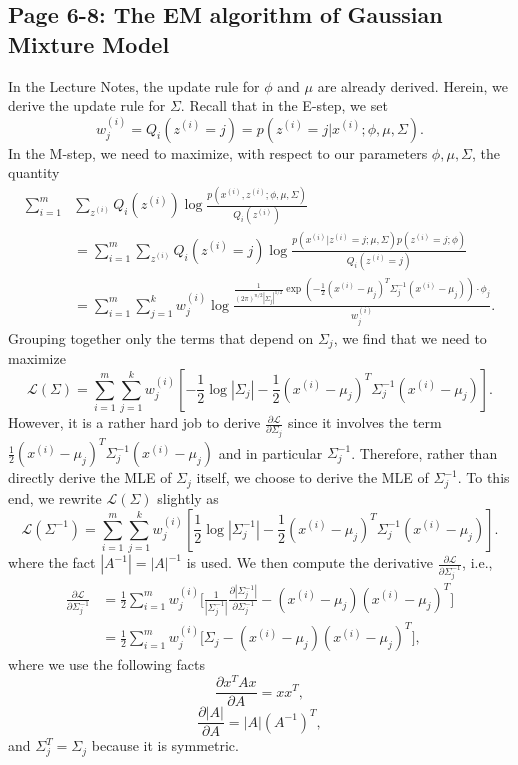\documentclass{article}
\begin{document}
\subsection{Page 6-8: The EM algorithm of Gaussian Mixture Model}
In the Lecture Notes, the update rule for $\phi$ and $\mu$ are already derived. Herein, we derive the update rule for $\Sigma$. Recall that in the E-step, we set
\[
w_j^{(i)}=Q_i(z^{(i)}=j)=p(z^{(i)}=j|x^{(i)};\phi,\mu,\Sigma).
\]
In the M-step, we need to maximize, with respect to our parameters $\phi,\mu,\Sigma$, the quantity
\[
\begin{split}
\sum_{i=1}^m &\sum_{z^{(i)}}Q_i(z^{(i)})\log\frac{p(x^{(i)},z^{(i)};\phi,\mu,\Sigma)}{Q_i(z^{(i)})}\\
&=\sum_{i=1}^m \sum_{z^{(i)}}Q_i(z^{(i)}=j)\log\frac{p(x^{(i)}|z^{(i)}=j;\mu,\Sigma)p(z^{(i)}=j;\phi)}{Q_i(z^{(i)}=j)}\\
&=\sum_{i=1}^m \sum_{j=1}^k w_j^{(i)}\log\frac{\frac{1}{(2\pi)^{n/2}|\Sigma_j|^{1/2}}%
            \exp{\left(-\frac{1}{2}(x^{(i)}-\mu_j)^T\Sigma_j^{-1}(x^{(i)}-\mu_j)\right)}\cdot\phi_j}{w_j^{(i)}}.
\end{split}
\]
Grouping together only the terms that depend on $\Sigma_j$, we find that we need to maximize
\[
\mathcal{L}(\Sigma)=\sum_{i=1}^m \sum_{j=1}^k w_j^{(i)}
\left[-\frac{1}{2}\log|\Sigma_j|-\frac{1}{2}(x^{(i)}-\mu_j)^T\Sigma_j^{-1}(x^{(i)}-\mu_j)\right].
\]
However, it is a rather hard job to derive $\frac{\partial{\mathcal{L}}}{\partial{\Sigma_j}}$ since it involves the term $\frac{1}{2}(x^{(i)}-\mu_j)^T\Sigma_j^{-1}(x^{(i)}-\mu_j)$ and in particular $\Sigma_j^{-1}$. Therefore, rather than directly derive the MLE of $\Sigma_j$ itself, we choose to derive the MLE of $\Sigma_j^{-1}$. To this end, we rewrite $\mathcal{L}(\Sigma)$ slightly as
\[
\mathcal{L}(\Sigma^{-1})=\sum_{i=1}^m \sum_{j=1}^k w_j^{(i)}
\left[\frac{1}{2}\log|\Sigma_j^{-1}|-\frac{1}{2}(x^{(i)}-\mu_j)^T\Sigma_j^{-1}(x^{(i)}-\mu_j)\right].
\]
where the fact $|A^{-1}|=|A|^{-1}$ is used. We then compute the derivative $\frac{\partial{\mathcal{L}}}{\partial{\Sigma_j^{-1}}}$, i.e.,
\[
\begin{split}
\frac{\partial{\mathcal{L}}}{\partial{\Sigma_j^{-1}}}%
&=\frac{1}{2}\sum_{i=1}^m  w_j^{(i)} \Bigg[\frac{1}{|\Sigma_j^{-1}|}
\frac{\partial{|\Sigma_j^{-1}|}}{\partial{\Sigma_j^{-1}}}%
-(x^{(i)}-\mu_j)(x^{(i)}-\mu_j)^T \Bigg]\\
&=\frac{1}{2}\sum_{i=1}^m  w_j^{(i)} \Big[\Sigma_j-(x^{(i)}-\mu_j)(x^{(i)}-\mu_j)^T\Big],
\end{split}
\]
where we use the following facts
\[
\frac{\partial{x^TAx}}{\partial{A}}=xx^T,
\]
\[
\frac{\partial{|A|}}{\partial{A}}=|A|(A^{-1})^T,
\]
and $\Sigma_j^T=\Sigma_j$ because it is symmetric.
\end{document}
